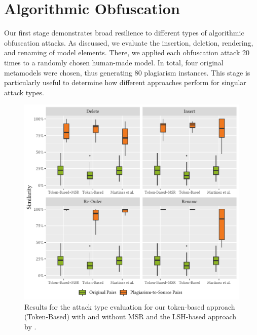 \section{Algorithmic Obfuscation}

\label{subsec:first-stage}

\noindent
Our first stage demonstrates broad resilience to different types of algorithmic obfuscation attacks.
As discussed, we evaluate the insertion, deletion, rendering, and renaming of model elements.
There, we applied each obfuscation attack 20 times to a randomly chosen human-made model.
In total, four original metamodels were chosen, thus generating 80 plagiarism instances.
This stage is particularly useful to determine how different approaches perform for singular attack types. 

\begin{figure}
\centering
\includegraphics[width=1\linewidth]{figures/disseval2/attacktypes_avg.similarity.pdf}
\caption[Evaluation: Algorithmic Obfuscation of Models]{Results for the attack type evaluation for our token-based approach (Token-Based) with and without MSR and the LSH-based approach by \citet{Martinez2020}.}
\label{fig:attacktypes-results}
\end{figure}


